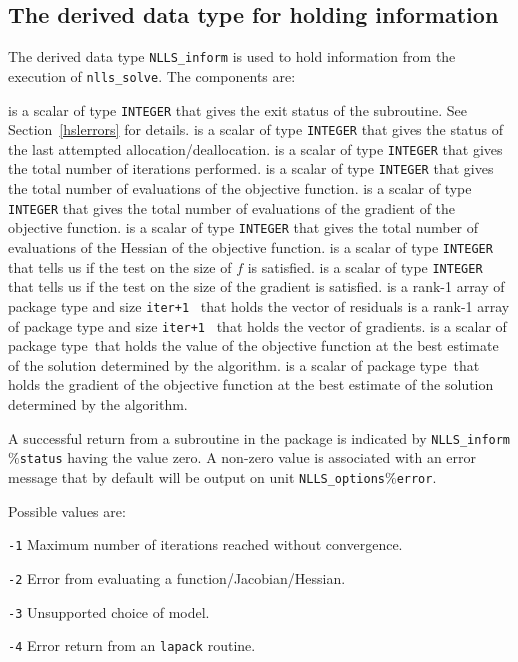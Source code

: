 \documentclass{spec}
\newcommand{\scalarinteger}{is a scalar of type {\tt INTEGER} }
\newcommand{\scalarreal}{is a scalar of package type\ }
\newcommand{\ronearrayreal}[1]{is a rank-1 array of package type and size {\tt #1}\ }
\begin{document}
\subsection{The derived data type for holding information}
\label{typeinform}
The derived data type {\tt NLLS\_inform} is used
to hold information from the execution of {\tt nlls\_solve}.
The components are:
\begin{description}
       \scalarinteger that gives the exit status of the subroutine.  See Section~\ref{hslerrors} for details.
 \scalarinteger that gives the status of the last attempted allocation/deallocation.
 \scalarinteger that gives the total number of iterations performed.
 \scalarinteger that gives the total number of evaluations of the objective function.
 \scalarinteger that gives the total number of evaluations of the gradient of the objective function.
 \scalarinteger that gives the total number of evaluations of the Hessian of the objective function.
 \scalarinteger that tells us if the test on the size of \(f\) is satisfied.
 \scalarinteger that tells us if the test on the size of the gradient is satisfied.
 \ronearrayreal{iter+1} that holds the vector of residuals
 \ronearrayreal{iter+1} that holds the vector of gradients.
 \scalarreal that holds the value of the objective function at the best estimate of the solution determined by the algorithm.
 \scalarreal that holds the gradient of the objective function at the best estimate of the solution determined by the algorithm.
\end{description}


\hslerrors

A successful return from a subroutine in the package is indicated by
{\tt NLLS\_inform$\%$status} having the value zero.
A non-zero value is associated with an error message that by default will
be output on unit {\tt NLLS\_options$\%$error}.

Possible values are:
\begin{description}
\item{} {\tt -1} Maximum number of iterations reached without convergence.
\item{} {\tt -2} Error from evaluating a function/Jacobian/Hessian.
\item{} {\tt -3} Unsupported choice of model.
\item{} {\tt -4} Error return from an {\tt lapack} routine.
\end{description}
\end{document}
